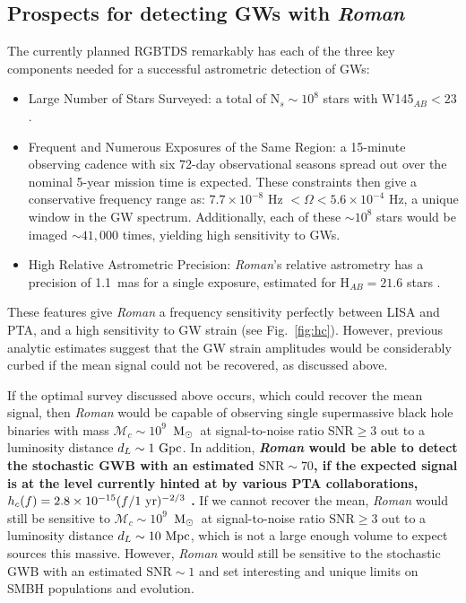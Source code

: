 \documentclass[12pt]{article}
\def\roman{\textit{Roman}\xspace}
\def\msun{${\rm{M}_\odot}$}
\newcommand{\e}[1]{\times 10^{#1}}
\begin{document}
\subsection*{Prospects for detecting GWs with \roman}
\label{subsec:snr}

\noindent The currently planned RGBTDS remarkably has each of the three key components needed for a successful astrometric detection of GWs:
\begin{itemize}
    \item Large Number of Stars Surveyed: a total of N$_s \sim 10^8$ stars with W145$_{AB} < 23$ \cite{Gaudi2019}.
    \item Frequent and Numerous Exposures of the Same Region: a 15-minute observing cadence with six 72-day observational seasons spread out over the nominal 5-year mission time is expected. These constraints then give a conservative frequency range as:
$7.7 \times 10^{-8}$ Hz $< \Omega < 5.6 \times 10^{-4}$ Hz, a unique window in the GW spectrum. Additionally, each of these $\sim 10^8$ stars would be imaged $\sim 41,000$ times, yielding high sensitivity to GWs.

    \item High Relative Astrometric Precision: \roman's relative astrometry has a precision of 1.1~\rm{mas} for a single exposure, estimated for H$_{AB} = 21.6$ stars \cite{WFIRST2019}.
\end{itemize}

\noindent These features give \roman a frequency sensitivity perfectly between LISA and PTA, and a high sensitivity to GW strain (see Fig.~\ref{fig:hc}). However, previous analytic estimates \citep{Wang2021, Wang2022} suggest that the GW strain amplitudes would be considerably curbed if the mean signal could not be recovered, as discussed above.

If the optimal survey discussed above occurs, which could recover the mean signal, then \roman would be capable of observing single supermassive black hole binaries with mass $\mathcal{M}_c \sim 10^9$~\msun\ at signal-to-noise ratio SNR$\geq 3$ out to a luminosity distance $d_L \sim 1~\rm{Gpc}$. In addition, \textbf{\roman would be able to detect the stochastic GWB with an estimated $\mathrm{SNR}\sim 70$, if the expected signal is at the level currently hinted at by various PTA collaborations, $h_c(f) = 2.8\e{-15}(f/1~\rm{yr})^{-2/3}$ \citep{NGGWBhint, EPTAGWBhint, PPTAGWBhint, IPTAGWBhint}.} If we cannot recover the mean, \roman would still be sensitive to $\mathcal{M}_c \sim 10^9$~\msun\ at signal-to-noise ratio SNR$\geq 3$ out to a luminosity distance $d_L \sim 10~\rm{Mpc}$, which is not a large enough volume to expect sources this massive. However, \roman would still be sensitive to the stochastic GWB with an estimated $\mathrm{SNR}\sim 1$ and set interesting and unique limits on SMBH populations and evolution.
\end{document}
